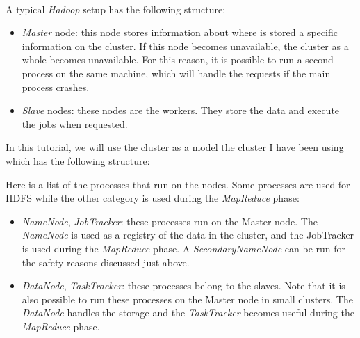 \documentclass[a4paper, 12pt]{article}
\begin{document}
~\\
A typical \textit{Hadoop} setup has the following structure:
\begin{itemize}
  \item \textit{Master} node: this node stores information about where is stored a specific information on the cluster. If this node becomes unavailable, the cluster as a whole becomes unavailable. For this reason, it is possible to run a second process on the same machine, which will handle the requests if the main process crashes.
  \item \textit{Slave} nodes: these nodes are the workers. They store the data and execute the jobs when requested.
\end{itemize}

In this tutorial, we will use the cluster as a model the cluster I have been using which has the following structure:

\begin{center}
\end{center}

Here is a list of the processes that run on the nodes. Some processes are used for HDFS while the other category is used during the \textit{MapReduce} phase:
\begin{itemize}
  \item \textit{NameNode}, \textit{JobTracker}: these processes run on the Master node. The \textit{NameNode} is used as a registry of the data in the cluster, and the JobTracker is used during the \textit{MapReduce} phase. A \textit{SecondaryNameNode} can be run for the safety reasons discussed just above.
  \item \textit{DataNode}, \textit{TaskTracker}: these processes belong to the slaves. Note that it is also possible to run these processes on the Master node in small clusters. The \textit{DataNode} handles the storage and the \textit{TaskTracker} becomes useful during the \textit{MapReduce} phase.
\end{itemize}
\end{document}
